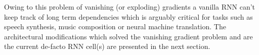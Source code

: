 Owing to this problem of vanishing (or exploding) gradients a vanilla RNN can't keep track of long term dependencies which is arguably critical for tasks such as speech synthesis, music composition or neural machine translation. The architectural modifications which solved the vanishing gradient problem and are the current de-facto RNN cell(s) are presented in the next section.

